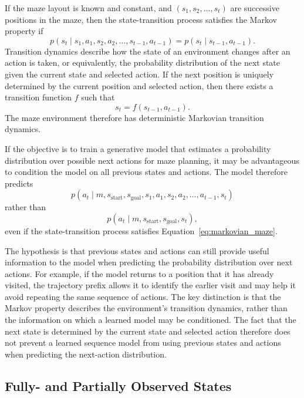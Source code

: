 ﻿\documentclass[12pt,a4paper]{article}
\theoremstyle{definition}
\begin{document}
If the maze layout is known and constant, and $(s_1,s_2,\dots,s_t)$ are successive
positions in the maze, then the state-transition process satisfies the Markov property if
\begin{equation}
p(s_t \mid s_1,a_1,s_2,a_2,\dots,s_{t-1},a_{t-1})
=
p(s_t \mid s_{t-1},a_{t-1}).
\label{eq:markovian_maze}
\end{equation}
Transition dynamics describe how the state of an environment changes after
an action is taken, or equivalently, the probability distribution of the next
state given the current state and selected action. If the next position is
uniquely determined by the current position and selected action, then there
exists a transition function \(f\) such that
\begin{equation}
    s_t = f(s_{t-1},a_{t-1}).
\end{equation}
The maze environment therefore has deterministic Markovian transition dynamics.

If the objective is to train a generative model that estimates a probability
distribution over possible next actions for maze planning, it may be
advantageous to condition the model on all previous states and actions. The
model therefore predicts
\begin{equation}
p(a_t \mid m,s_{\mathrm{start}},s_{\mathrm{goal}},
s_1,a_1,s_2,a_2,\dots,a_{t-1},s_t)
\end{equation}
rather than
\begin{equation}
p(a_t \mid m,s_{\mathrm{start}},s_{\mathrm{goal}},s_t),
\end{equation}
even if the state-transition process satisfies
Equation~\eqref{eq:markovian_maze}.

The hypothesis is that previous states and actions can still provide useful
information to the model when predicting the probability distribution over
next actions. For example, if the model returns to a position that it has
already visited, the trajectory prefix allows it to identify the earlier visit
and may help it avoid repeating the same sequence of actions. The key
distinction is that the Markov property describes the environment's transition
dynamics, rather than the information on which a learned model may be
conditioned. The fact that the next state is determined by the current state
and selected action therefore does not prevent a learned sequence model from
using previous states and actions when predicting the next-action distribution.


\subsection{Fully- and Partially Observed States}
\end{document}
